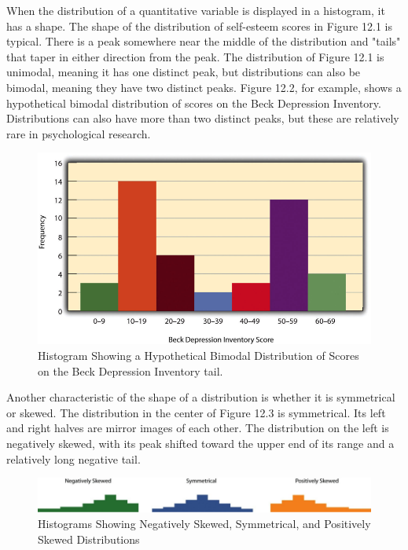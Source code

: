 When the distribution of a quantitative variable is displayed in a histogram, it has a shape. The shape of the distribution of self-esteem scores in Figure 12.1 is typical. There is a peak somewhere near the middle of the distribution and "tails" that taper in either direction from the peak. The distribution of Figure 12.1 is unimodal, meaning it has one distinct peak, but distributions can also be bimodal, meaning they have two distinct peaks. Figure 12.2, for example, shows a hypothetical bimodal distribution of scores on the Beck Depression Inventory. Distributions can also have more than two distinct peaks, but these are relatively rare in psychological research.


\begin{figure}

\includegraphics[width=\linewidth]{figures/Fig122}

\caption{Histogram Showing a Hypothetical Bimodal Distribution of Scores on the Beck Depression Inventory
tail. }

\label{fig:bimodal}

\end{figure}

Another characteristic of the shape of a distribution is whether it is symmetrical or skewed. The distribution in the center of Figure 12.3 is symmetrical. Its left and right halves are mirror images of each other. The distribution on the left is negatively skewed, with its peak shifted toward the upper end of its range and a relatively long negative
tail.  

\begin{figure}
\includegraphics[width=\linewidth]{figures/Fig123}
\caption{Histograms Showing Negatively Skewed, Symmetrical, and Positively Skewed Distributions}
\label{fig:skew}
\end{figure}

